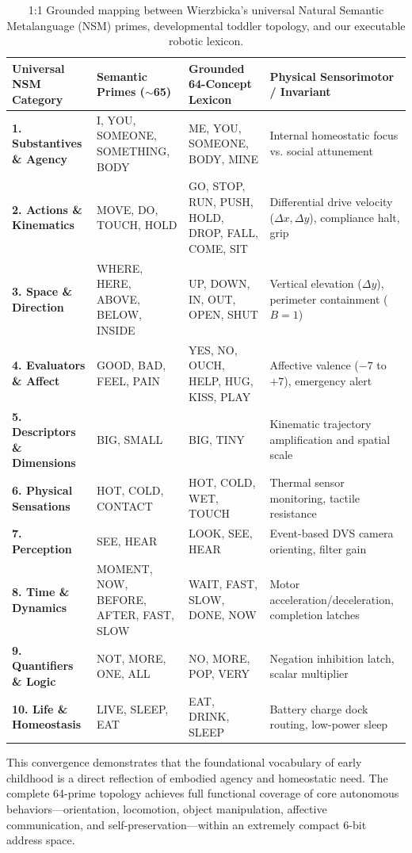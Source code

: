 \documentclass[journal,twocolumn]{IEEEtran}
\begin{document}
\begin{table}[t]
\centering
\caption{1:1 Grounded mapping between Wierzbicka's universal Natural Semantic Metalanguage (NSM) primes, developmental toddler topology, and our executable robotic lexicon.}
\label{tab:primes}
\begin{tabular}{llll}
\toprule
\textbf{Universal NSM Category} & \textbf{Semantic Primes ($\sim$65)} & \textbf{Grounded 64-Concept Lexicon} & \textbf{Physical Sensorimotor / Invariant} \\
\midrule
\textbf{1. Substantives \& Agency} & I, YOU, SOMEONE, SOMETHING, BODY & ME, YOU, SOMEONE, BODY, MINE & Internal homeostatic focus vs. social attunement \\
\textbf{2. Actions \& Kinematics} & MOVE, DO, TOUCH, HOLD & GO, STOP, RUN, PUSH, HOLD, DROP, FALL, COME, SIT & Differential drive velocity ($\Delta x, \Delta y$), compliance halt, grip \\
\textbf{3. Space \& Direction} & WHERE, HERE, ABOVE, BELOW, INSIDE & UP, DOWN, IN, OUT, OPEN, SHUT & Vertical elevation ($\Delta y$), perimeter containment ($B=1$) \\
\textbf{4. Evaluators \& Affect} & GOOD, BAD, FEEL, PAIN & YES, NO, OUCH, HELP, HUG, KISS, PLAY & Affective valence ($-7$ to $+7$), emergency alert \\
\textbf{5. Descriptors \& Dimensions} & BIG, SMALL & BIG, TINY & Kinematic trajectory amplification and spatial scale \\
\textbf{6. Physical Sensations} & HOT, COLD, CONTACT & HOT, COLD, WET, TOUCH & Thermal sensor monitoring, tactile resistance \\
\textbf{7. Perception} & SEE, HEAR & LOOK, SEE, HEAR & Event-based DVS camera orienting, filter gain \\
\textbf{8. Time \& Dynamics} & MOMENT, NOW, BEFORE, AFTER, FAST, SLOW & WAIT, FAST, SLOW, DONE, NOW & Motor acceleration/deceleration, completion latches \\
\textbf{9. Quantifiers \& Logic} & NOT, MORE, ONE, ALL & NO, MORE, POP, VERY & Negation inhibition latch, scalar multiplier \\
\textbf{10. Life \& Homeostasis} & LIVE, SLEEP, EAT & EAT, DRINK, SLEEP & Battery charge dock routing, low-power sleep \\
\bottomrule
\end{tabular}
\end{table}

This convergence demonstrates that the foundational vocabulary of early childhood is a direct reflection of embodied agency and homeostatic need. The complete 64-prime topology achieves full functional coverage of core autonomous behaviors---orientation, locomotion, object manipulation, affective communication, and self-preservation---within an extremely compact 6-bit address space.
\end{document}
